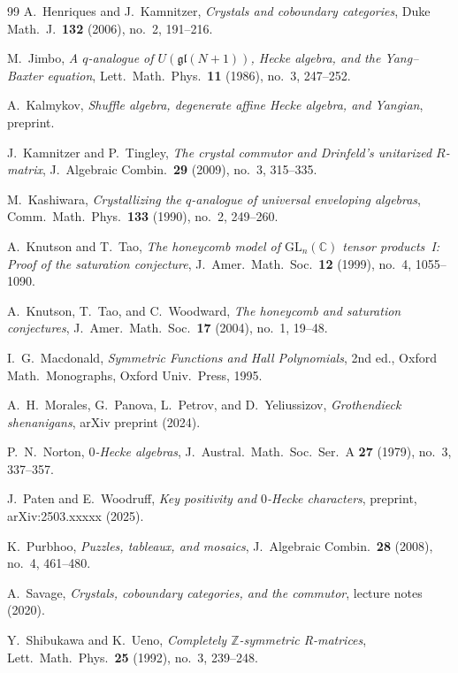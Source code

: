 \documentclass[11pt,a4paper]{article}
\theoremstyle{plain}
\theoremstyle{definition}
\theoremstyle{remark}
\begin{document}
\begin{thebibliography}{99}
A.~Henriques and J.~Kamnitzer,
\emph{Crystals and coboundary categories},
Duke Math.~J.\ \textbf{132} (2006), no.~2, 191--216.

M.~Jimbo,
\emph{A $q$-analogue of $U(\mathfrak{gl}(N+1))$, Hecke algebra,
and the Yang--Baxter equation},
Lett.\ Math.\ Phys.\ \textbf{11} (1986), no.~3, 247--252.

A.~Kalmykov,
\emph{Shuffle algebra, degenerate affine Hecke algebra, and Yangian},
preprint.

J.~Kamnitzer and P.~Tingley,
\emph{The crystal commutor and Drinfeld's unitarized $R$-matrix},
J.~Algebraic Combin.\ \textbf{29} (2009), no.~3, 315--335.

M.~Kashiwara,
\emph{Crystallizing the $q$-analogue of universal enveloping algebras},
Comm.\ Math.\ Phys.\ \textbf{133} (1990), no.~2, 249--260.

A.~Knutson and T.~Tao,
\emph{The honeycomb model of $\mathrm{GL}_n(\mathbb{C})$ tensor products~I:
Proof of the saturation conjecture},
J.~Amer.\ Math.\ Soc.\ \textbf{12} (1999), no.~4, 1055--1090.

A.~Knutson, T.~Tao, and C.~Woodward,
\emph{The honeycomb and saturation conjectures},
J.~Amer.\ Math.\ Soc.\ \textbf{17} (2004), no.~1, 19--48.

I.~G.~Macdonald,
\emph{Symmetric Functions and Hall Polynomials},
2nd ed., Oxford Math.\ Monographs, Oxford Univ.\ Press, 1995.

A.~H.~Morales, G.~Panova, L.~Petrov, and D.~Yeliussizov,
\emph{Grothendieck shenanigans},
arXiv preprint (2024).

P.~N.~Norton,
\emph{$0$-Hecke algebras},
J.~Austral.\ Math.\ Soc.\ Ser.~A \textbf{27} (1979), no.~3, 337--357.

J.~Paten and E.~Woodruff,
\emph{Key positivity and $0$-Hecke characters},
preprint, arXiv:2503.xxxxx (2025).

K.~Purbhoo,
\emph{Puzzles, tableaux, and mosaics},
J.~Algebraic Combin.\ \textbf{28} (2008), no.~4, 461--480.

A.~Savage,
\emph{Crystals, coboundary categories, and the commutor},
lecture notes (2020).

Y.~Shibukawa and K.~Ueno,
\emph{Completely $\mathbb{Z}$-symmetric R-matrices},
Lett.\ Math.\ Phys.\ \textbf{25} (1992), no.~3, 239--248.


\end{thebibliography}
\end{document}
